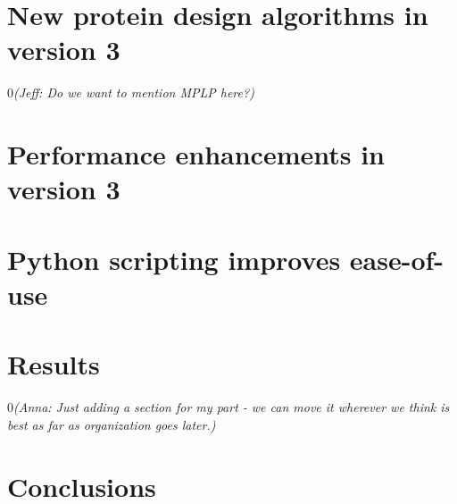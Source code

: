\documentclass[11pt, oneside]{article}   	%
\def\submissionMode{0}
\newcommand{\jeff}[1]{\if\submissionMode0{\em\color{blue}(Jeff: #1)}\else\fi}
\newcommand{\anna}[1]{\if\submissionMode0{\em\color{purple}(Anna: #1)}\else\fi}
\begin{document}
\section{New protein design algorithms in version 3}




\jeff{Do we want to mention MPLP here?}

\section{Performance enhancements in version 3}



\section{Python scripting improves ease-of-use}


\section{Results} \anna{Just adding a section for my part - we can move it wherever we think is best as far as organization goes later.}


\section{Conclusions}




\end{document}
